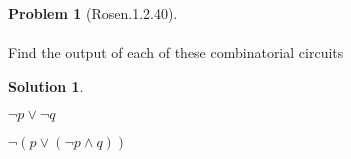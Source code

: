 \documentclass{article}
\theoremstyle{definition}
\newtheorem*{problem}{Problem}
\newtheorem*{solution}{Solution}
\begin{document}
\begin{problem}[Rosen.1.2.40]\ \\
\ \\
Find the output of each of these combinatorial circuits\ \\
\begin{compactenum}
\renewcommand{\theenumi}{\alph{enumi}}
\item
\item
\end{compactenum}
\end{problem}

\begin{solution}\ \\

\begin{compactenum}
\renewcommand{\theenumi}{\alph{enumi}}  
\item $\neg p \vee \neg q$
\item $\neg(p \vee ( \neg p \wedge q))$





\end{compactenum}
\end{solution}
\end{document}
